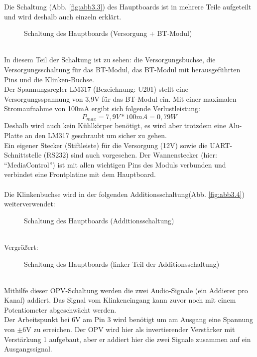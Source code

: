 Die Schaltung (Abb. \ref{fig:abb3.3}) des Hauptboards ist in mehrere Teile aufgeteilt und wird deshalb auch einzeln erklärt.
\begin{figure} [h]
	\centering
	\caption{Schaltung des Hauptboards (Versorgung + BT-Modul)}
\end{figure} \\
In diesem Teil der Schaltung ist zu sehen: die Versorgungsbuchse, die Versorgungsschaltung für das BT-Modul, das BT-Modul mit herausgeführten Pins und die Klinken-Buchse.\\
Der Spannungsregler LM317 (Bezeichnung: U201) stellt eine Versorgungsspannung von 3,9V für das BT-Modul ein. Mit einer maximalen Stromaufnahme von 100mA ergibt sich folgende Verlustleistung:
\begin{equation}
	P_{max} = 7,9V * 100mA = 0,79W
\end{equation}
Deshalb wird auch kein Kühlkörper benötigt, es wird aber trotzdem eine Alu-Platte an den LM317 geschraubt um sicher zu gehen. \\
Ein eigener Stecker (Stiftleiste) für die Versorgung (12V) sowie die UART-Schnittstelle (RS232) sind auch vorgesehen. Der Wannenstecker (hier: \enquote{MediaControl}) ist mit allen wichtigen Pins des Moduls verbunden und verbindet eine Frontplatine mit dem Hauptboard. \\ \\
Die Klinkenbuchse wird in der folgenden Additionsschaltung(Abb. \ref {fig:abb3.4}) weiterverwendet:
\begin{figure} [h]
	\centering
	\caption{Schaltung des Hauptboards (Additionsschaltung)}
\end{figure} \\
Vergrößert:
\begin{figure} [h]
	\centering
	\caption{Schaltung des Hauptboards (linker Teil der Additionsschaltung)}
\end{figure} \\
Mithilfe dieser OPV-Schaltung werden die zwei Audio-Signale (ein Addierer pro Kanal) addiert. Das Signal vom Klinkeneingang kann zuvor noch mit einem Potentiometer abgeschwächt werden.\\
Der Arbeitspunkt bei 6V am Pin 3 wird benötigt um am Ausgang eine Spannung von $\pm$6V zu erreichen. Der OPV wird hier als invertierender Verstärker mit Verstärkung 1 aufgebaut, aber er addiert hier die zwei Signale zusammen auf ein Ausgangssignal.

